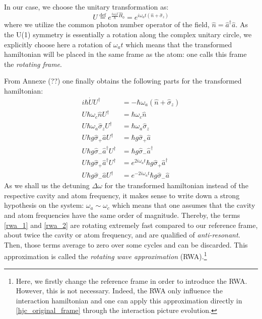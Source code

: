 \documentclass[10pt]{report}
\begin{document}
In our case, we choose the unitary transformation as:
\begin{equation}
\label{unitary_trans_def}
U \stackrel{\text{def}}{=} e^{\frac{i\omega_at}{\hbar}\hat{H}_0} = e^{i\omega_at(\hat{n} + \hat{\sigma}_z)}
\end{equation}
where we utilize the common photon number operator of the field, $\hat{n} = \hat{a}^{\dag}\hat{a}$. As the U(1) symmetry is essentially a rotation along the complex unitary circle, we explicitly choose here a rotation of $\omega_at$ which means that the transformed hamiltonian will be placed in the same frame as the atom: one calls this frame the \textit{rotating frame}.

From Annexe (??) one finally obtains the following parts for the transformed hamiltonian:
\begin{align}
i\hbar \dot{U} U^{\dag} &= -\hbar\omega_a(\hat{n} + \hat{\sigma}_z)\\
U\hbar \omega_c\hat{n} U^{\dag} &= \hbar\omega_c\hat{n}\\
U\hbar \omega_a\hat{\sigma}_z U^{\dag} &= \hbar\omega_a\hat{\sigma}_z\\
U\hbar g\hat{\sigma}_+\hat{a} U^{\dag} &= \hbar g\hat{\sigma}_+\hat{a}\\
U\hbar g\hat{\sigma}_-\hat{a}^{\dag} U^{\dag} &= \hbar g\hat{\sigma}_-\hat{a}^{\dag}\\
\label{rwa_1}
U\hbar g\hat{\sigma}_+\hat{a}^{\dag} U^{\dag} &= e^{2i\omega_at}\hbar g\hat{\sigma}_+\hat{a}^{\dag}\\
\label{rwa_2}
U\hbar g\hat{\sigma}_-\hat{a} U^{\dag} &= e^{-2i\omega_at}\hbar g\hat{\sigma}_-\hat{a}
\end{align}
As we shall us the detuning $\Delta\omega$ for the transformed hamiltonian instead of the respective cavity and atom frequency, it makes sense to write down a strong hypothesis on the system: $\omega_a \sim \omega_c$ which means that one assumes that the cavity and atom frequencies have the same order of magnitude. Thereby, the terms \eqref{rwa_1} and \eqref{rwa_2} are rotating extremely fast compared to our reference frame, about twice the cavity or atom frequency, and are qualified of \textit{anti-resonant}. Then, those terms average to zero over some cycles and can be discarded. This approximation is called the \textit{rotating wave approximation} (RWA).\footnote{Here, we firstly change the reference frame in order to introduce the RWA. However, this is not necessary. Indeed, the RWA only influence the interaction hamiltonian and one can apply this approximation directly in \eqref{hjc_original_frame} through the interaction picture evolution.}
\end{document}
